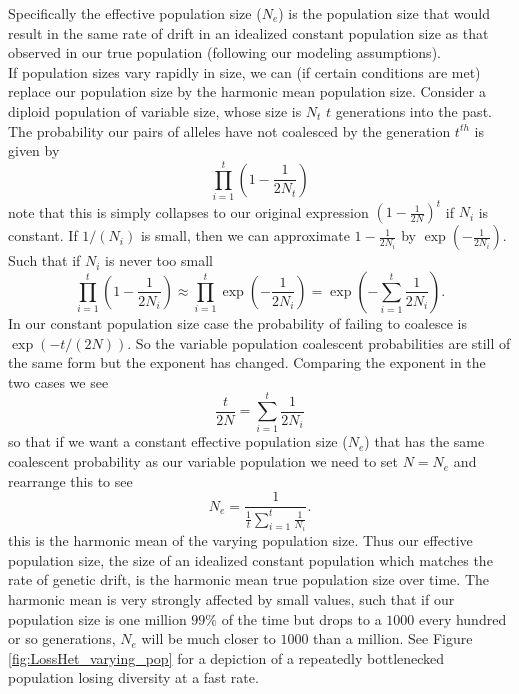 Specifically the effective population size ($N_e$) is the population size that
would result in the same rate of drift in an idealized constant population size
as that observed in our true population (following our modeling assumptions).
\\

If population sizes vary rapidly in size, we can (if certain conditions are met)
replace our population size by the harmonic mean population size.
Consider a diploid population of variable size, whose size is $N_t$ $t$ generations into the
past. The probability our pairs of alleles have not coalesced by the generation $t^{th}$ is
given by
\begin{equation}
\prod_{i=1}^{t} \left(1-\frac{1}{2N_t} \right)
\end{equation}
note that this is simply collapses to our original expression
$\left(1-\frac{1}{2N } \right)^t $ if $N_i$ is constant. If $1/(N_i)$ is
small, then we can approximate $1-\frac{1}{2N_i}$ by
$\exp(-\frac{1}{2N_i})$. Such that if $N_i$ is never too small
\begin{equation}
\prod_{i=1}^{t} \left(1-\frac{1}{2N_i} \right)
\approx \prod_{i=1}^{t} \exp \left( -\frac{1}{2N_i} \right)   =
\exp \left(- \sum_{i=1}^{t} \frac{1}{2N_i} \right) .
\end{equation}
In our constant population size case
the probability of failing to coalesce is $\exp(-t/(2N))$. So the
variable population coalescent probabilities are still of the same form but
the exponent has changed. Comparing the exponent in the two cases we see
\begin{equation}
\frac{t}{2N} = \sum_{i=1}^{t} \frac{1}{2N_i}
\end{equation}
so that if we want a constant effective population size ($N_e$) that has the same
coalescent probability as our variable population we need to set
$N=N_e$ and rearrange this to see
\begin{equation}
N_e =\frac{1}{\frac{1}{t} \sum_{i=1}^{t} \frac{1}{N_i} }.
\end{equation}
this is the harmonic mean of the varying population size. Thus our
effective population size, the size of an idealized constant
population which matches the rate of genetic drift, is the harmonic
mean true population size over time. The harmonic mean is very
strongly affected by small values, such that if our population size is
one million $99\%$ of the time but drops to a $1000$ every hundred or
so generations, $N_e$ will be much closer to $1000$ than a
million. See Figure \ref{fig:LossHet_varying_pop}  for a depiction of
a repeatedly bottlenecked population losing diversity at a fast rate.\\


